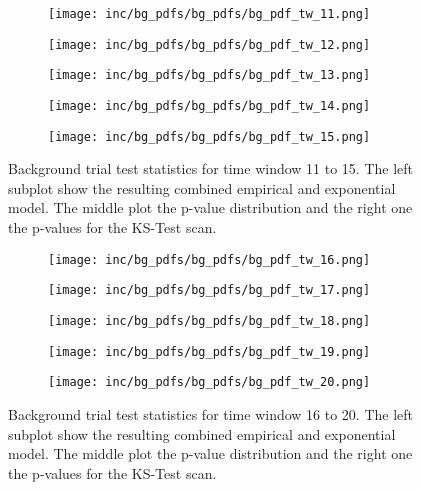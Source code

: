 \begin{figure}[htpb]
  \begin{subfigure}[c]{\textwidth}
    \texttt{[image: inc/bg\_pdfs/bg\_pdfs/bg\_pdf\_tw\_11.png]}
  \end{subfigure}
  \begin{subfigure}[c]{\textwidth}
    \texttt{[image: inc/bg\_pdfs/bg\_pdfs/bg\_pdf\_tw\_12.png]}
  \end{subfigure}
  \begin{subfigure}[c]{\textwidth}
    \texttt{[image: inc/bg\_pdfs/bg\_pdfs/bg\_pdf\_tw\_13.png]}
  \end{subfigure}
  \begin{subfigure}[c]{\textwidth}
    \texttt{[image: inc/bg\_pdfs/bg\_pdfs/bg\_pdf\_tw\_14.png]}
  \end{subfigure}
  \begin{subfigure}[c]{\textwidth}
    \texttt{[image: inc/bg\_pdfs/bg\_pdfs/bg\_pdf\_tw\_15.png]}
  \end{subfigure}
  \caption{Background trial test statistics for time window 11 to 15. The left subplot show the resulting combined empirical and exponential model. The middle plot the p-value distribution and the right one the p-values for the KS-Test scan.}
\end{figure}

\begin{figure}[htpb]
  \begin{subfigure}[c]{\textwidth}
    \texttt{[image: inc/bg\_pdfs/bg\_pdfs/bg\_pdf\_tw\_16.png]}
  \end{subfigure}
  \begin{subfigure}[c]{\textwidth}
    \texttt{[image: inc/bg\_pdfs/bg\_pdfs/bg\_pdf\_tw\_17.png]}
  \end{subfigure}
  \begin{subfigure}[c]{\textwidth}
    \texttt{[image: inc/bg\_pdfs/bg\_pdfs/bg\_pdf\_tw\_18.png]}
  \end{subfigure}
  \begin{subfigure}[c]{\textwidth}
    \texttt{[image: inc/bg\_pdfs/bg\_pdfs/bg\_pdf\_tw\_19.png]}
  \end{subfigure}
  \begin{subfigure}[c]{\textwidth}
    \texttt{[image: inc/bg\_pdfs/bg\_pdfs/bg\_pdf\_tw\_20.png]}
  \end{subfigure}
  \caption{Background trial test statistics for time window 16 to 20. The left subplot show the resulting combined empirical and exponential model. The middle plot the p-value distribution and the right one the p-values for the KS-Test scan.}
\end{figure}

